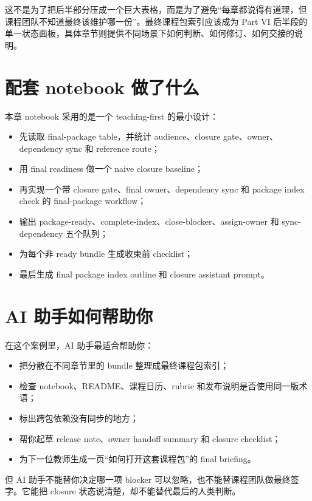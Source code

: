 这不是为了把后半部分压成一个巨大表格，而是为了避免“每章都说得有道理，但课程团队不知道最终该维护哪一份”。最终课程包索引应该成为 Part VI 后半段的单一状态面板，具体章节则提供不同场景下如何判断、如何修订、如何交接的说明。

\section{配套 notebook 做了什么}

本章 notebook 采用的是一个 teaching-first 的最小设计：

\begin{itemize}
    \item 先读取 final-package table，并统计 audience、closure gate、owner、dependency sync 和 reference route；
    \item 用 final readiness 做一个 naive closure baseline；
    \item 再实现一个带 closure gate、final owner、dependency sync 和 package index check 的 final-package workflow；
    \item 输出 package-ready、complete-index、close-blocker、assign-owner 和 sync-dependency 五个队列；
    \item 为每个非 ready bundle 生成收束前 checklist；
    \item 最后生成 final package index outline 和 closure assistant prompt。
\end{itemize}

\section{AI 助手如何帮助你}

在这个案例里，AI 助手最适合帮助你：

\begin{itemize}
    \item 把分散在不同章节里的 bundle 整理成最终课程包索引；
    \item 检查 notebook、README、课程日历、rubric 和发布说明是否使用同一版术语；
    \item 标出跨包依赖没有同步的地方；
    \item 帮你起草 release note、owner handoff summary 和 closure checklist；
    \item 为下一位教师生成一页“如何打开这套课程包”的 final briefing。
\end{itemize}

但 AI 助手不能替你决定哪一项 blocker 可以忽略，也不能替课程团队做最终签字。它能把 closure 状态说清楚，却不能替代最后的人类判断。

